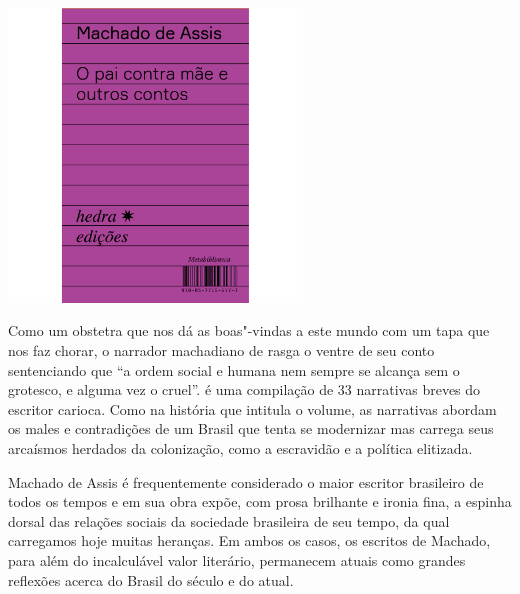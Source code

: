 \pagebreak

\begin{center}
\hspace*{-3.5cm}
\hspace*{3cm}\includegraphics[width=78mm]{./grid/machado.jpg}
\end{center}

\hspace*{-7cm}\hrulefill\hspace*{-7cm}

\medskip

\noindent{}Como um obstetra que nos dá as boas"-vindas a este mundo com um tapa que nos faz chorar, o narrador machadiano de {} rasga o ventre de seu conto sentenciando que “a ordem social e humana nem sempre se alcança sem o grotesco, e alguma vez o cruel”. {} é uma compilação de 33 narrativas breves do escritor carioca. Como na história que intitula o volume, as narrativas abordam os males e contradições de um Brasil que tenta se modernizar mas carrega seus arcaísmos herdados da colonização, como a escravidão e a política elitizada.

Machado de Assis é frequentemente considerado o maior escritor brasileiro de todos os tempos e em sua obra expõe, com prosa brilhante e ironia fina, a espinha dorsal das relações sociais da sociedade brasileira de seu tempo, da qual carregamos hoje muitas heranças. Em ambos os casos, os escritos de Machado, para além do incalculável valor literário, permanecem atuais como grandes reflexões acerca do Brasil do século  e do atual.


\vfill

\hspace*{-.4cm}\begin{minipage}[c]{.5\linewidth}
\small{
{}}
\end{minipage}


